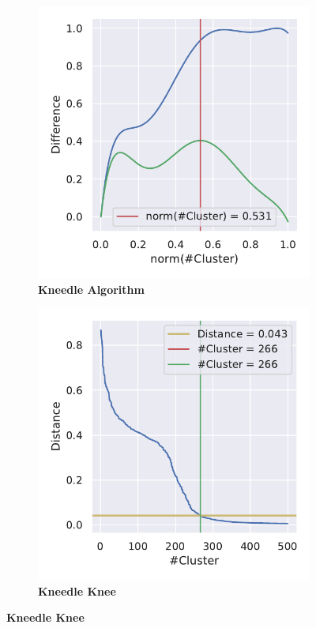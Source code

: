 \begin{figure}[!hbt]
    \centering
    \begin{subfigure}[b]{0.475\textwidth}
        \caption[Kneedle Algorithm]{\textbf{Kneedle Algorithm}}
        \label{subfig:UMAP_Cluster_Knee_Kneedle_4}            \includegraphics[width=\textwidth]{UMAP/Cluster_Knee_Segment_4.pdf}
    \end{subfigure}
    \hfill
    \begin{subfigure}[b]{0.475\textwidth}
        \caption[Kneedle Knee]{\textbf{Kneedle Knee}}
        \label{subfig:UMAP_Cluster_Knee_Elbow_4}            \includegraphics[width=\textwidth]{UMAP/Cluster_Elbow_Knee_Segment_4.pdf}

\end{subfigure}
\end{figure}
